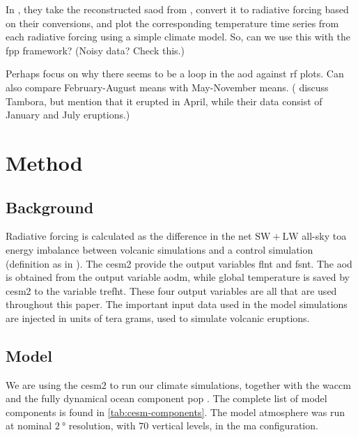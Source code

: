 \documentclass[twocol]{ametsocV5}
\newcommand{\iso}[1][i]{{#1}njected \ce{SO2}}
\begin{document}
In \citet{marshall2020}, they take the reconstructed \acrshort{saod} from
\citet{toohey2017}, convert it to radiative forcing based on their conversions, and plot
the corresponding temperature time series from each radiative forcing using a simple
climate model. So, can we use this with the \acrfull{fpp} framework?
(Noisy data? Check this.)

Perhaps focus on why there seems to be a loop in the \acrshort{aod} against
\acrshort{rf} plots. Can also compare February-August means with May-November means.
(\citet{marshall2021} discuss Tambora, but mention that it erupted in April, while their
data consist of January and July eruptions.)


\section{Method}

\subsection{Background}

Radiative forcing is calculated as the difference in the net \( \mathrm{SW} +
\mathrm{LW} \) all-sky \acrshort{toa} energy imbalance between volcanic simulations and
a control simulation (definition as in \citet{marshall2020}). The \acrshort{cesm2}
provide the output variables \acrfull{flnt} and \acrfull{fsnt}. The \acrshort{aod} is
obtained from the output variable \acrfull{aodm}, while global temperature is saved by
\acrshort{cesm2} to the variable \acrfull{trefht}. These four output variables are all
that are used throughout this paper. The important input data used in the model
simulations are \iso{} in units of tera grams, used to simulate volcanic eruptions.

\subsection{Model}

We are using the \acrfull{cesm2} \citep{danabasoglu2020} to run our climate simulations,
together with the \acrfull{waccm} \citep{gettleman2019} and the fully dynamical ocean
component \acrfull{pop} \citep{smith2010, danabasoglu2020}. The complete list of model
components is found in \cref{tab:cesm-components}. The model atmosphere was run at
nominal \(\SI{2}{\degree}\) resolution, with \(70\) vertical levels, in the \acrfull{ma}
configuration.
\end{document}
